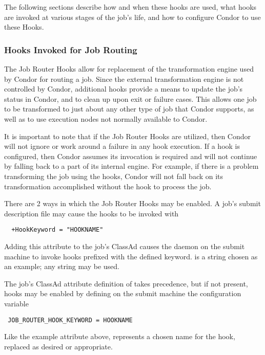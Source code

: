The following sections describe how and when these hooks are used,
what hooks are invoked at various stages of the job's life, 
and how to configure Condor to use these Hooks.

\subsubsection{\label{sec:job-hooks-JR}
Hooks Invoked for Job Routing}

The Job Router Hooks allow for replacement of the transformation engine used
by Condor for routing a job.
Since the external transformation engine is not controlled by Condor,
additional hooks provide a means to update the job's
status in Condor, and to clean up upon exit or failure cases.
This allows one job to be transformed to just about any other type of job
that Condor supports,
as well as to use execution nodes not normally available to Condor.

It is important to note that if the Job Router Hooks are utilized, 
then Condor will not ignore or work around a failure in any hook execution.
If a hook is configured,
then Condor assumes its invocation is required and will not
continue by falling back to a part of its internal engine.
For example,
if there is a problem transforming the job using the hooks,
Condor will not fall back on its transformation accomplished without the hook
to process the job.

There are 2 ways in which the Job Router Hooks may be enabled.
A job's submit description file may cause the hooks to be invoked with 
\footnotesize
\begin{verbatim}
  +HookKeyword = "HOOKNAME"
\end{verbatim}
\normalsize
Adding this attribute to the job's ClassAd causes the 
daemon on the submit machine to invoke hooks prefixed with the defined keyword.
 is a string chosen as an example; any string may be used.

The job's ClassAd attribute definition of  takes
precedence,
but if not present, hooks may be enabled by defining on the submit machine
the configuration variable 
\footnotesize
\begin{verbatim}
 JOB_ROUTER_HOOK_KEYWORD = HOOKNAME
\end{verbatim}
\normalsize
Like the example attribute above,
 represents a chosen name for the hook, 
replaced as desired or appropriate.

